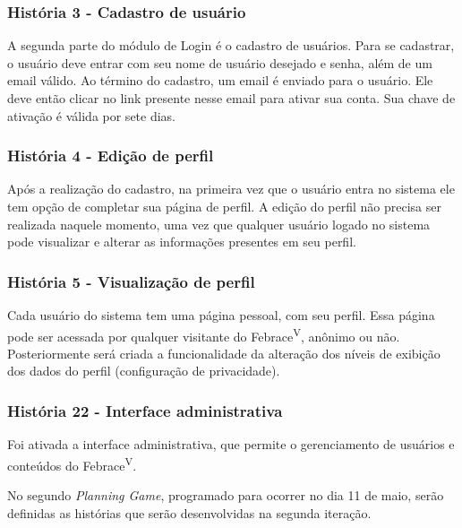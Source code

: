     \subsubsection{História 3 - Cadastro de usuário}
      A segunda parte do módulo de Login é o cadastro de usuários. Para se cadastrar, o usuário deve entrar com seu nome de usuário desejado e senha, além de um email válido. Ao término do cadastro, um email é enviado para o usuário. Ele deve então clicar no link presente nesse email para ativar sua conta. Sua chave de ativação é válida por sete dias.

    \subsubsection{História 4 - Edição de perfil}
      Após a realização do cadastro, na primeira vez que o usuário entra no sistema ele tem opção de completar sua página de perfil. A edição do perfil não precisa ser realizada naquele momento, uma vez que qualquer usuário logado no sistema pode visualizar e alterar as informações presentes em seu perfil.

    \subsubsection{História 5 - Visualização de perfil}
      Cada usuário do sistema tem uma página pessoal, com seu perfil. Essa página pode ser acessada por qualquer visitante do Febrace\textsuperscript{V}, anônimo ou não. Posteriormente será criada a funcionalidade da alteração dos níveis de exibição dos dados do perfil (configuração de privacidade).

    \subsubsection{História 22 - Interface administrativa}
      Foi ativada a interface administrativa, que permite o gerenciamento de usuários e conteúdos do Febrace\textsuperscript{V}.

    No segundo \textit{Planning Game}, programado para ocorrer no dia 11 de maio, serão definidas as histórias que serão desenvolvidas na segunda iteração.
